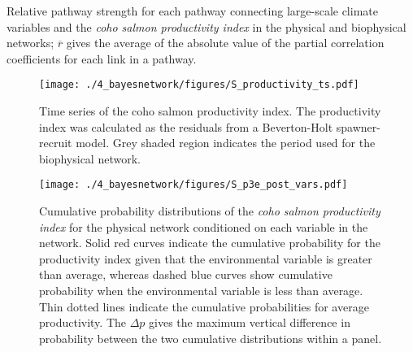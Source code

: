 \newpage
\begin{table}[!ht]
  \small \centering \libertineLF
  \caption[Relative pathway strength for each pathway connecting large-scale
           climate variables and the coho salmon productivity index.]{Relative
           pathway strength for each pathway connecting large-scale climate
           variables and the \emph{coho salmon productivity index} in the
           physical and biophysical networks; $\overline{r}$ gives the average
           of the absolute value of the partial correlation coefficients for
           each link in a pathway.}
  
  \label{tab:bn:s1}
\end{table}



\begin{figure}[htbp]
  \centering \texttt{[image: ./4\_bayesnetwork/figures/S\_productivity\_ts.pdf]}
  \caption[Time series of the coho salmon productivity index.]{Time series of
           the coho salmon productivity index. The productivity index was
           calculated as the residuals from a Beverton-Holt spawner-recruit
           model. Grey shaded region indicates the period used for the
           biophysical network.}
  \label{fig:bn:s1}
\end{figure}

\begin{figure}[htbp]
  \centering \texttt{[image: ./4\_bayesnetwork/figures/S\_p3e\_post\_vars.pdf]}
  \caption[Cumulative probability distributions of the coho salmon
           productivity index for the physical network conditioned on each
           variable in the network.]{Cumulative probability distributions of the
           \emph{coho salmon productivity index} for the physical network
           conditioned on each variable in the network. Solid red curves
           indicate the cumulative probability for the productivity index given
           that the environmental variable is greater than average, whereas
           dashed blue curves show cumulative probability when the
           environmental variable is less than average. Thin dotted lines
           indicate the cumulative probabilities for average productivity. The
           \(\Delta p\) gives the maximum vertical difference in probability
           between the two cumulative distributions within a panel.}
  \label{fig:bn:s2}
\end{figure}


